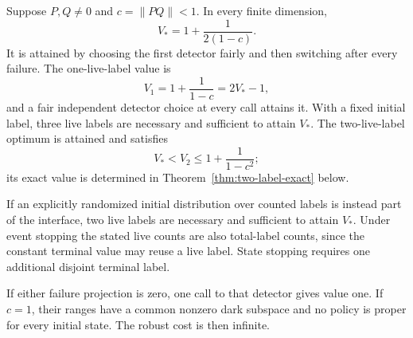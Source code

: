\begin{theorem}\label{thm:detector-memory}
Suppose $P,Q\ne0$ and $c=\|PQ\|<1$. In every finite dimension,
\begin{equation}\label{eq:detector-global}
 V_*=1+\frac1{2(1-c)}.
\end{equation}
It is attained by choosing the first detector fairly and then switching after every failure. The one-live-label value is
\begin{equation}\label{eq:detector-one}
 V_1=1+\frac1{1-c}=2V_*-1,
\end{equation}
and a fair independent detector choice at every call attains it. With a fixed initial label, three live labels are necessary and sufficient to attain $V_*$. The two-live-label optimum is attained and satisfies
\begin{equation}\label{eq:detector-two}
 V_*<V_2\le1+\frac1{1-c^2};
\end{equation}
its exact value is determined in Theorem~\ref{thm:two-label-exact} below.

If an explicitly randomized initial distribution over counted labels is instead part of the interface, two live labels are necessary and sufficient to attain $V_*$. Under event stopping the stated live counts are also total-label counts, since the constant terminal value may reuse a live label. State stopping requires one additional disjoint terminal label.

If either failure projection is zero, one call to that detector gives value one. If $c=1$, their ranges have a common nonzero dark subspace and no policy is proper for every initial state. The robust cost is then infinite.
\end{theorem}
